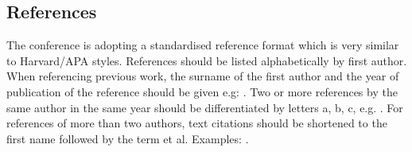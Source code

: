 \documentclass[A4,10pt,twoside]{article}
\begin{document}
\subsection{References}
The conference is adopting a standardised reference format which is very similar to Harvard/APA styles. References should be listed alphabetically by first author. When referencing previous work, the surname of the first author and the year of publication of the reference should be given e.g: \cite{sharkey1996yorick}. Two or more references by the same author in the same year should be differentiated by letters a, b, c, e.g. \citet{author1990a,author1990b,author1990c}. For references of more than two authors, text citations should be shortened to the first name followed by the term et al. Examples: \cite{author1990a}.


 
 
\end{document}

